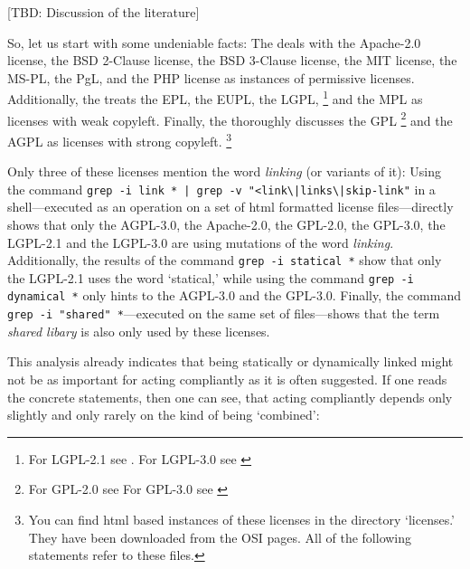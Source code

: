 [TBD: Discussion of the literature]

So, let us start with some undeniable facts: The \oslic{} deals with 
the Apache-2.0 license,\citeAPL{}
the BSD 2-Clause license,\citeBSDsimple{} 
the BSD 3-Clause license,\citeBSDnew{} 
the MIT license,\citeMIT{} 
the MS-PL,\citeMSPL{} 
the PgL,\citePGL{}
and the PHP license\citePHP{} 
as instances of permissive licenses.
Additionally, the \oslic{} treats 
the EPL,\citeEPL{} 
the EUPL,\citeEUPL{} 
the LGPL,
  \footnote{For LGPL-2.1 see \cite[cf.][\nopage wp]{Lgpl21OsiLicense1999a}. 
  For LGPL-3.0 see \cite [cf.][\nopage wp]{Lgpl30OsiLicense2007a} } 
and the MPL\citeMPL{}
as licenses with weak copyleft. Finally, the \oslic{} thoroughly discusses 
the GPL%
  \footnote{For GPL-2.0 see \cite [cf.][\nopage wp]{Gpl20OsiLicense1991a} 
  For GPL-3.0 see \cite [cf.][\nopage wp]{Gpl30OsiLicense2007a} } 
and the AGPL\citeAGPL{}
as licenses with strong copyleft.%
  \footnote{You can find html based instances of these licenses in the
    \oslic{} directory `licenses.' They have been downloaded from the
    OSI pages. All of the following statements refer to these files.}

Only three of these licenses mention the word \emph{linking} (or variants of
it): Using the command \texttt{grep -i link * | grep -v
"<link\textbackslash{}|links\textbackslash{}|skip-link"} in a shell---executed
as an operation on a set of html formatted license files---directly shows that
only the AGPL-3.0, the Apache-2.0, the GPL-2.0, the GPL-3.0, the LGPL-2.1 and
the LGPL-3.0 are using mutations of the word \emph{linking}. Additionally, the
results of the command \texttt{grep -i statical *} show that only the LGPL-2.1
uses the word `statical,' while using the command \texttt{grep -i dynamical *}
only hints to the AGPL-3.0 and the GPL-3.0. Finally, the command \texttt{grep -i
"shared" *}---executed on the same set of files---shows that the term
\emph{shared libary} is also only used by these licenses.

This analysis already indicates that being statically or dynamically linked
might not be as important for acting compliantly as it is often suggested.
% 
If one reads the concrete statements, then one can see, that acting compliantly
depends only slightly and only rarely on the kind of being `combined':

